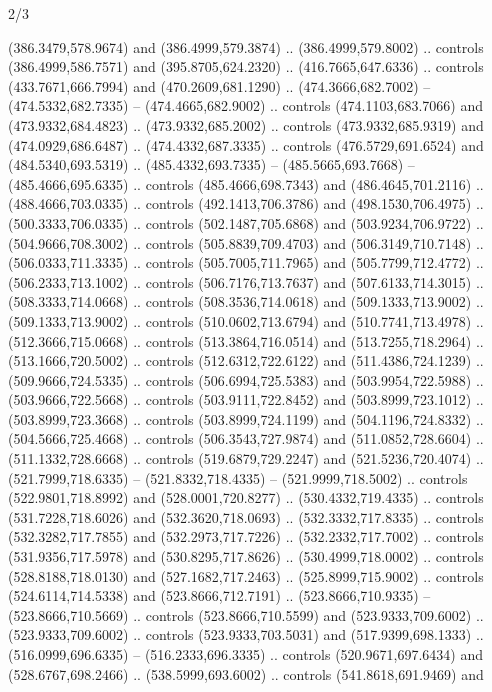 \begin{flagdescription}{2/3}
\begin{scope}[xshift=0.5\flaglength,yshift=0.5\flagwidth,scale=\flagwidth/525.28]
\begin{scope}[y=0.1mm, x=0.1mm, yscale=-1,shift={(-381.5,-404)}]
\begin{scope}[shift={(5.25001,4.53053)},miter limit=4.00,line width=0.800\lw]
  (386.3479,578.9674) and (386.4999,579.3874) .. (386.4999,579.8002) .. controls
  (386.4999,586.7571) and (395.8705,624.2320) .. (416.7665,647.6336) .. controls
  (433.7671,666.7994) and (470.2609,681.1290) .. (474.3666,682.7002) --
  (474.5332,682.7335) -- (474.4665,682.9002) .. controls (474.1103,683.7066) and
  (473.9332,684.4823) .. (473.9332,685.2002) .. controls (473.9332,685.9319) and
  (474.0929,686.6487) .. (474.4332,687.3335) .. controls (476.5729,691.6524) and
  (484.5340,693.5319) .. (485.4332,693.7335) -- (485.5665,693.7668) --
  (485.4666,695.6335) .. controls (485.4666,698.7343) and (486.4645,701.2116) ..
  (488.4666,703.0335) .. controls (492.1413,706.3786) and (498.1530,706.4975) ..
  (500.3333,706.0335) .. controls (502.1487,705.6868) and (503.9234,706.9722) ..
  (504.9666,708.3002) .. controls (505.8839,709.4703) and (506.3149,710.7148) ..
  (506.0333,711.3335) .. controls (505.7005,711.7965) and (505.7799,712.4772) ..
  (506.2333,713.1002) .. controls (506.7176,713.7637) and (507.6133,714.3015) ..
  (508.3333,714.0668) .. controls (508.3536,714.0618) and (509.1333,713.9002) ..
  (509.1333,713.9002) .. controls (510.0602,713.6794) and (510.7741,713.4978) ..
  (512.3666,715.0668) .. controls (513.3864,716.0514) and (513.7255,718.2964) ..
  (513.1666,720.5002) .. controls (512.6312,722.6122) and (511.4386,724.1239) ..
  (509.9666,724.5335) .. controls (506.6994,725.5383) and (503.9954,722.5988) ..
  (503.9666,722.5668) .. controls (503.9111,722.8452) and (503.8999,723.1012) ..
  (503.8999,723.3668) .. controls (503.8999,724.1199) and (504.1196,724.8332) ..
  (504.5666,725.4668) .. controls (506.3543,727.9874) and (511.0852,728.6604) ..
  (511.1332,728.6668) .. controls (519.6879,729.2247) and (521.5236,720.4074) ..
  (521.7999,718.6335) -- (521.8332,718.4335) -- (521.9999,718.5002) .. controls
  (522.9801,718.8992) and (528.0001,720.8277) .. (530.4332,719.4335) .. controls
  (531.7228,718.6026) and (532.3620,718.0693) .. (532.3332,717.8335) .. controls
  (532.3282,717.7855) and (532.2973,717.7226) .. (532.2332,717.7002) .. controls
  (531.9356,717.5978) and (530.8295,717.8626) .. (530.4999,718.0002) .. controls
  (528.8188,718.0130) and (527.1682,717.2463) .. (525.8999,715.9002) .. controls
  (524.6114,714.5338) and (523.8666,712.7191) .. (523.8666,710.9335) --
  (523.8666,710.5669) .. controls (523.8666,710.5599) and (523.9333,709.6002) ..
  (523.9333,709.6002) .. controls (523.9333,703.5031) and (517.9399,698.1333) ..
  (516.0999,696.6335) -- (516.2333,696.3335) .. controls (520.9671,697.6434) and
  (528.6767,698.2466) .. (538.5999,693.6002) .. controls (541.8618,691.9469) and

\end{scope}
\end{scope}
\end{scope}
\end{flagdescription}
